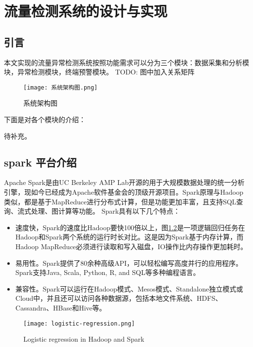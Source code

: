 \chapter{流量检测系统的设计与实现}
\section{引言}
本文实现的流量异常检测系统按照功能需求可以分为三个模块：数据采集和分析模块，异常检测模块，终端预警模块。
TODO: 图中加入关系矩阵
\begin{figure}
    \centering
    \texttt{[image: 系统架构图.png]}
    \caption{系统架构图}
    \label{fig:arch}
  \end{figure}


下面是对各个模块的介绍：

待补充。

\section{spark 平台介绍}
Apache Spark是由UC Berkeley AMP Lab开源的用于大规模数据处理的统一分析引擎\cite{spark}，现如今已经成为Apache软件基金会的顶级开源项目。Spark原理与Hadoop类似，都是基于MapReduce进行分布式计算，但是功能更加丰富，且支持SQL查询、流式处理、图计算等功能。
Spark具有以下几个特点：

\begin{itemize}
  \item 速度快，Spark的速度比Hadoop要快100倍以上，图\ref{fig:Logistic regression in Hadoop and Spark}是一项逻辑回归任务在Hadoop和Spark两个系统的运行时长对比。这是因为Spark基于内存计算，而Hadoop MapReduce必须进行读取和写入磁盘，IO操作比内存操作更加耗时。
  \item 易用性。Spark提供了80余种高级API，可以轻松编写高度并行的应用程序。Spark支持Java, Scala, Python, R, and SQL等多种编程语言。
  \item 兼容性。Spark可以运行在Hadoop模式、Mesos模式、Standalone独立模式或Cloud中，并且还可以访问各种数据源，包括本地文件系统、HDFS、Cassandra、HBase和Hive等。
\end{itemize}
\begin{figure}
  \centering
  \texttt{[image: logistic-regression.png]}
  \caption{Logistic regression in Hadoop and Spark}
  \label{fig:Logistic regression in Hadoop and Spark}
\end{figure}


